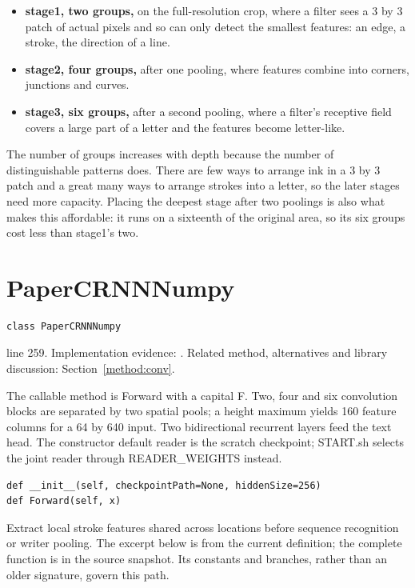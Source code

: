\begin{itemize}\setlength\itemsep{0pt}
  \item \textbf{stage1, two groups,} on the full-resolution crop, where a filter sees a 3 by 3 patch of actual pixels and so can only detect the smallest features: an edge, a stroke, the direction of a line.
  \item \textbf{stage2, four groups,} after one pooling, where features combine into corners, junctions and curves.
  \item \textbf{stage3, six groups,} after a second pooling, where a filter's receptive field covers a large part of a letter and the features become letter-like.
\end{itemize}
The number of groups increases with depth because the number of distinguishable patterns does. There are few ways to arrange ink in a 3 by 3 patch and a great many ways to arrange strokes into a letter, so the later stages need more capacity. Placing the deepest stage after two poolings is also what makes this affordable: it runs on a sixteenth of the original area, so its six groups cost less than stage1's two.



\section{PaperCRNNNumpy}\label{fn:recognise:PaperCRNNNumpy}
\begin{lstlisting}[style=sig]
class PaperCRNNNumpy
\end{lstlisting}
 line 259. Implementation evidence: \cite{code2026}. Related method, alternatives and library discussion: Section~\ref{method:conv}.


The callable method is Forward with a capital F. Two, four and six convolution blocks are separated by two spatial pools; a height maximum yields 160 feature columns for a 64 by 640 input. Two bidirectional recurrent layers feed the text head. The constructor default reader is the scratch checkpoint; START.sh selects the joint reader through READER\_WEIGHTS instead.


\begin{lstlisting}[style=plain]
def __init__(self, checkpointPath=None, hiddenSize=256)
def Forward(self, x)
\end{lstlisting}
Extract local stroke features shared across locations before sequence recognition or writer pooling. The excerpt below is from the current definition; the complete function is in the source snapshot. Its constants and branches, rather than an older signature, govern this path.


